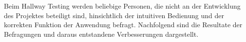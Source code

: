 Beim Hallway Testing werden beliebige Personen, die nicht an der Entwicklung des Projektes beteiligt sind, hinsichtlich der intuitiven Bedienung und der korrekten Funktion der Anwendung befragt. Nachfolgend sind die Resultate der Befragungen und daraus entstandene Verbesserungen dargestellt.